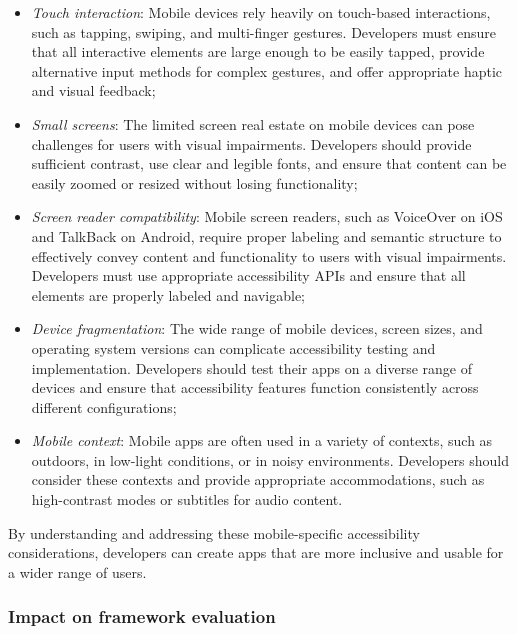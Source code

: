 \begin{itemize}
    \item \textit{Touch interaction}: Mobile devices rely heavily on touch-based interactions, such as tapping, swiping, and multi-finger gestures. Developers must ensure that all interactive elements are large enough to be easily tapped, provide alternative input methods for complex gestures, and offer appropriate haptic and visual feedback;
    
    \item \textit{Small screens}: The limited screen real estate on mobile devices can pose challenges for users with visual impairments. Developers should provide sufficient contrast, use clear and legible fonts, and ensure that content can be easily zoomed or resized without losing functionality;
    
    \item \textit{Screen reader compatibility}: Mobile screen readers, such as VoiceOver on iOS and TalkBack on Android, require proper labeling and semantic structure to effectively convey content and functionality to users with visual impairments. Developers must use appropriate accessibility APIs and ensure that all elements are properly labeled and navigable;
    
    \item \textit{Device fragmentation}: The wide range of mobile devices, screen sizes, and operating system versions can complicate accessibility testing and implementation. Developers should test their apps on a diverse range of devices and ensure that accessibility features function consistently across different configurations;
    
    \item \textit{Mobile context}: Mobile apps are often used in a variety of contexts, such as outdoors, in low-light conditions, or in noisy environments. Developers should consider these contexts and provide appropriate accommodations, such as high-contrast modes or subtitles for audio content.
\end{itemize}

By understanding and addressing these mobile-specific accessibility considerations, developers can create apps that are more inclusive and usable for a wider range of users.

\subsubsection{Impact on framework evaluation}

